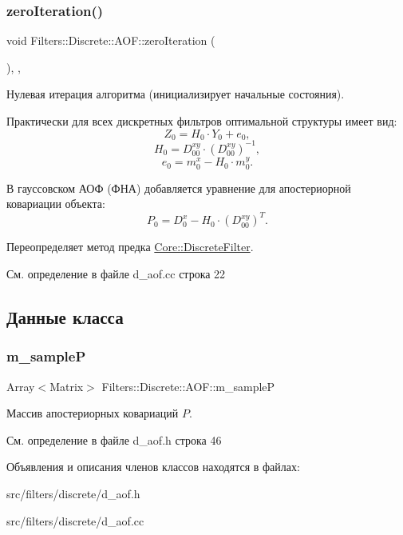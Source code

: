 \subsubsection{\texorpdfstring{zero\+Iteration()}{zeroIteration()}}
{\footnotesize\ttfamily void Filters\+::\+Discrete\+::\+A\+O\+F\+::zero\+Iteration (\begin{DoxyParamCaption}{ }\end{DoxyParamCaption})\hspace{0.3cm}{\ttfamily [override]}, {\ttfamily [protected]}, {\ttfamily [virtual]}}



Нулевая итерация алгоритма (инициализирует начальные состояния). 

Практически для всех дискретных фильтров оптимальной структуры имеет вид\+: \[Z_0 = H_0 \cdot Y_0 + e_0,\] \[H_0 = D_{00}^{xy} \cdot (D_{00}^{xy})^{-1},\] \[e_0 = m_0^x - H_0 \cdot m_0^y.\]

В гауссовском АОФ (ФНА) добавляется уравнение для апостериорной ковариации объекта\+: \[P_0 = D_0^x - H_0 \cdot (D_{00}^{xy})^T.\] 

Переопределяет метод предка \hyperlink{class_core_1_1_discrete_filter_a658617c64c7067bb6b98b5e9d78f982e}{Core\+::\+Discrete\+Filter}.



См. определение в файле d\+\_\+aof.\+cc строка 22



\subsection{Данные класса}
\hypertarget{class_filters_1_1_discrete_1_1_a_o_f_aef55ce0cf7129bb7090f8e470bcfbc1f}{}\label{class_filters_1_1_discrete_1_1_a_o_f_aef55ce0cf7129bb7090f8e470bcfbc1f} 
\subsubsection{\texorpdfstring{m\+\_\+sampleP}{m\_sampleP}}
{\footnotesize\ttfamily Array$<$Matrix$>$ Filters\+::\+Discrete\+::\+A\+O\+F\+::m\+\_\+sampleP\hspace{0.3cm}{\ttfamily [protected]}}

Массив апостериорных ковариаций $P$. 

См. определение в файле d\+\_\+aof.\+h строка 46



Объявления и описания членов классов находятся в файлах\+:\begin{DoxyCompactItemize}
\item 
src/filters/discrete/d\+\_\+aof.\+h\item 
src/filters/discrete/d\+\_\+aof.\+cc\end{DoxyCompactItemize}
